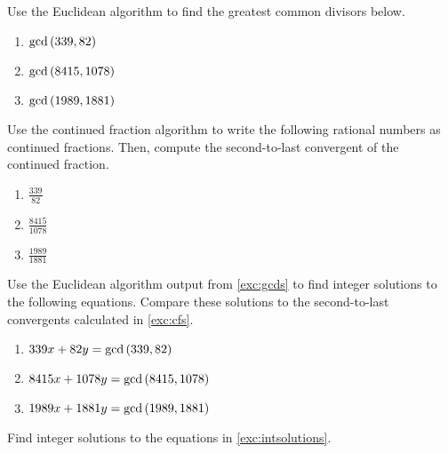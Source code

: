 \begin{exercise}
  \label{exc:gcds}
  Use the Euclidean algorithm to find the greatest common divisors
  below.

  \begin{enumerate}[label=(\alph*)]
  \item $\gcd\left( 339, 82 \right)$
  \item $\gcd\left( 8415, 1078 \right)$
  \item $\gcd\left( 1989, 1881 \right)$
  \end{enumerate}
\end{exercise}

\begin{exercise}
  \label{exc:cfs}
  Use the continued fraction algorithm to write the following rational
  numbers as continued fractions. Then, compute the second-to-last
  convergent of the continued fraction.

  \begin{enumerate}[label=(\alph*)]
  \item $\frac{339}{82}$
  \item $\frac{8415}{1078}$
  \item $\frac{1989}{1881}$
  \end{enumerate}
\end{exercise}

\begin{exercise}
  \label{exc:intsolutions}
  Use the Euclidean algorithm output from \cref{exc:gcds} to find
  integer solutions to the following equations. Compare these
  solutions to the second-to-last convergents calculated in
  \cref{exc:cfs}.

  \begin{enumerate}[label=(\alph*)]
  \item $339x + 82y = \gcd\left( 339, 82 \right)$
  \item $8415x + 1078y = \gcd\left( 8415, 1078 \right)$
  \item $1989x + 1881y = \gcd\left( 1989, 1881 \right)$
  \end{enumerate}
\end{exercise}

\begin{exercise}
  Find  integer solutions to the equations in
  \cref{exc:intsolutions}.
\end{exercise}